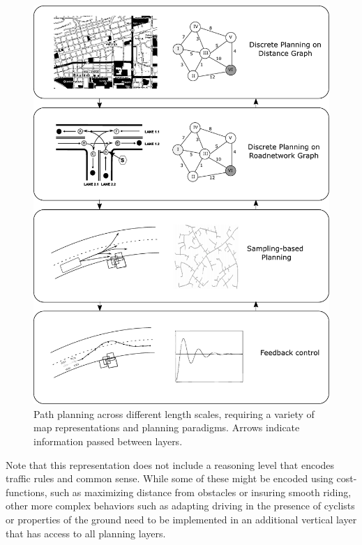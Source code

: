 \begin{figure}
    \centering
    \includegraphics[width=\textwidth]{figs/planninglayers.pdf}
    \caption{Path planning across different length scales, requiring a variety of map representations and planning paradigms. Arrows indicate information passed between layers.\label{fig:planninglayers}}
\end{figure}

Note that this representation does not include a reasoning level that encodes traffic rules and common sense. While some of these might be encoded using cost-functions, such as maximizing distance from obstacles or insuring smooth riding, other more complex behaviors such as adapting driving in the presence of cyclists or properties of the ground need to be implemented in an additional vertical layer that has access to all planning layers.


